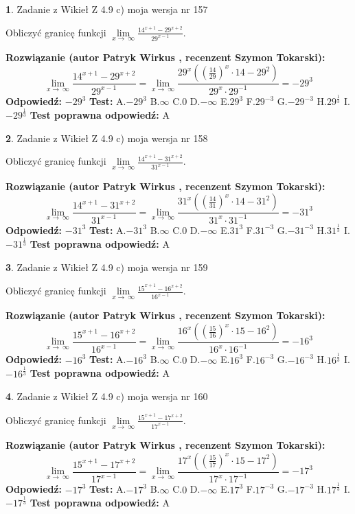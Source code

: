 \documentclass[12pt, a4paper]{article}
\theoremstyle{definition} %
\newtheorem{zad}{}
\newcommand{\zadStart}[1]{\begin{zad}#1\newline}
\newcommand{\zadStop}{\end{zad}}
\newcommand{\rozwStart}[2]{\noindent \textbf{Rozwiązanie (autor #1 , recenzent #2): }\newline}
\newcommand{\rozwStop}{\newline}
\newcommand{\odpStart}{\noindent \textbf{Odpowiedź:}\newline}
\newcommand{\odpStop}{\newline}
\newcommand{\testStart}{\noindent \textbf{Test:}\newline}
\newcommand{\testStop}{\newline}
\newcommand{\kluczStart}{\noindent \textbf{Test poprawna odpowiedź:}\newline}
\newcommand{\kluczStop}{\newline}
\begin{document}
\zadStart{Zadanie z Wikieł Z 4.9 c) moja wersja nr 157}


Obliczyć granicę funkcji  $\lim\limits_{x\to\ \infty}\frac{14^{x+1}-29^{x+2}}{29^{x-1}}$.
\zadStop
\rozwStart{Patryk Wirkus}{Szymon Tokarski}
$$\lim\limits_{x\to\ \infty}\frac{14^{x+1}-29^{x+2}}{29^{x-1}}=\lim\limits_{x\to\ \infty}\frac{29^{x}((\frac{14}{29})^{x}\cdot 14 -29^{2})}{29^{x}\cdot 29^{-1}} = -29^{3}$$
\rozwStop
\odpStart
$-29^{3}$
\odpStop
\testStart
A.$-29^{3}$ B.$\infty$ C.$0$ D.$-\infty$ E.$29^{3}$
F.$29^{-3}$ G.$-29^{-3}$
H.$29^{\frac{1}{3}}$
I.$-29^{\frac{1}{3}}$
\testStop
\kluczStart
A
\kluczStop



\zadStart{Zadanie z Wikieł Z 4.9 c) moja wersja nr 158}


Obliczyć granicę funkcji  $\lim\limits_{x\to\ \infty}\frac{14^{x+1}-31^{x+2}}{31^{x-1}}$.
\zadStop
\rozwStart{Patryk Wirkus}{Szymon Tokarski}
$$\lim\limits_{x\to\ \infty}\frac{14^{x+1}-31^{x+2}}{31^{x-1}}=\lim\limits_{x\to\ \infty}\frac{31^{x}((\frac{14}{31})^{x}\cdot 14 -31^{2})}{31^{x}\cdot 31^{-1}} = -31^{3}$$
\rozwStop
\odpStart
$-31^{3}$
\odpStop
\testStart
A.$-31^{3}$ B.$\infty$ C.$0$ D.$-\infty$ E.$31^{3}$
F.$31^{-3}$ G.$-31^{-3}$
H.$31^{\frac{1}{3}}$
I.$-31^{\frac{1}{3}}$
\testStop
\kluczStart
A
\kluczStop



\zadStart{Zadanie z Wikieł Z 4.9 c) moja wersja nr 159}


Obliczyć granicę funkcji  $\lim\limits_{x\to\ \infty}\frac{15^{x+1}-16^{x+2}}{16^{x-1}}$.
\zadStop
\rozwStart{Patryk Wirkus}{Szymon Tokarski}
$$\lim\limits_{x\to\ \infty}\frac{15^{x+1}-16^{x+2}}{16^{x-1}}=\lim\limits_{x\to\ \infty}\frac{16^{x}((\frac{15}{16})^{x}\cdot 15 -16^{2})}{16^{x}\cdot 16^{-1}} = -16^{3}$$
\rozwStop
\odpStart
$-16^{3}$
\odpStop
\testStart
A.$-16^{3}$ B.$\infty$ C.$0$ D.$-\infty$ E.$16^{3}$
F.$16^{-3}$ G.$-16^{-3}$
H.$16^{\frac{1}{3}}$
I.$-16^{\frac{1}{3}}$
\testStop
\kluczStart
A
\kluczStop



\zadStart{Zadanie z Wikieł Z 4.9 c) moja wersja nr 160}


Obliczyć granicę funkcji  $\lim\limits_{x\to\ \infty}\frac{15^{x+1}-17^{x+2}}{17^{x-1}}$.
\zadStop
\rozwStart{Patryk Wirkus}{Szymon Tokarski}
$$\lim\limits_{x\to\ \infty}\frac{15^{x+1}-17^{x+2}}{17^{x-1}}=\lim\limits_{x\to\ \infty}\frac{17^{x}((\frac{15}{17})^{x}\cdot 15 -17^{2})}{17^{x}\cdot 17^{-1}} = -17^{3}$$
\rozwStop
\odpStart
$-17^{3}$
\odpStop
\testStart
A.$-17^{3}$ B.$\infty$ C.$0$ D.$-\infty$ E.$17^{3}$
F.$17^{-3}$ G.$-17^{-3}$
H.$17^{\frac{1}{3}}$
I.$-17^{\frac{1}{3}}$
\testStop
\kluczStart
A
\kluczStop
\end{document}
